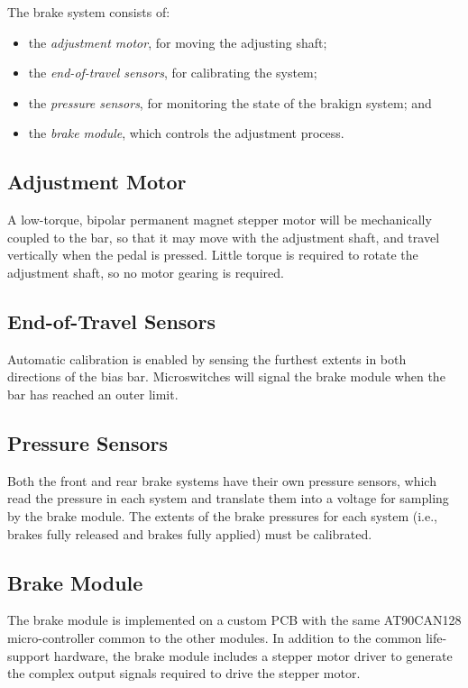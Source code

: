 The brake system consists of: 

\begin{itemize}
\item the \emph{adjustment motor}, for moving the adjusting shaft;
\item the \emph{end-of-travel sensors}, for calibrating the system; 
\item the \emph{pressure sensors}, for monitoring the state of the brakign system; and
\item the \emph{brake module}, which controls the adjustment process.
\end{itemize}

\subsection{Adjustment Motor}

A low-torque, bipolar permanent magnet stepper motor will be mechanically coupled to the bar, so that it may move with the adjustment shaft, and travel vertically when the pedal is pressed. Little torque is required to rotate the adjustment shaft, so no motor gearing is required. 

\subsection{End-of-Travel Sensors}

Automatic calibration is enabled by sensing the furthest extents in both directions of the bias bar. Microswitches will signal the brake module when the bar has reached an outer limit. 

\subsection{Pressure Sensors}

Both the front and rear brake systems have their own pressure sensors, which read the pressure in each system and translate them into a voltage for sampling by the brake module. The extents of the brake pressures for each system (i.e., brakes fully released and brakes fully applied) must be calibrated.

\subsection{Brake Module}

The brake module is implemented on a custom PCB with the same AT90CAN128 micro-controller common to the other modules. In addition to the common life-support hardware, the brake module includes a stepper motor driver to generate the complex output signals required to drive the stepper motor.

